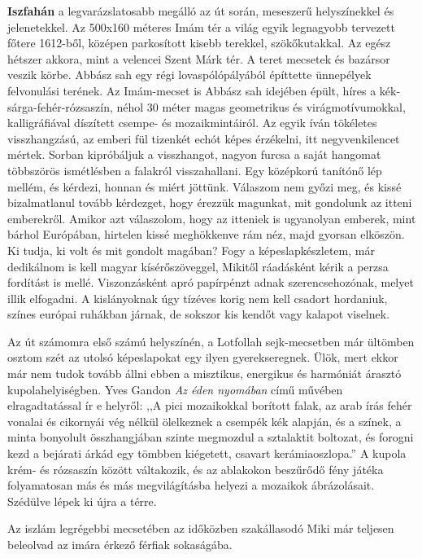 \textbf{Iszfahán} a legvarázslatosabb megálló az út során, meseszerű
helyszínekkel és jelenetekkel. Az 500x160 méteres Imám tér a világ egyik
legnagyobb tervezett főtere 1612-ből, középen parkosított kisebb terekkel,
szökőkutakkal. Az egész hétszer akkora, mint a velencei Szent
Márk tér. A teret mecsetek és bazársor veszik körbe. Abbász sah egy
régi lovaspólópályából építtette ünnepélyek felvonulási terének. Az
Imám-mecset is Abbász sah idejében épült, híres a kék-sárga-fehér-rózsaszín,
néhol 30 méter magas geometrikus és virágmotívumokkal,
kalligráfiával díszített csempe- és mozaikmintáiról. Az egyik íván
tökéletes visszhangzású, az emberi fül tizenkét echót képes érzékelni,
itt negyvenkilencet mértek. Sorban kipróbáljuk a visszhangot, nagyon
furcsa a saját hangomat többszörös ismétlésben a falakról visszahallani.
Egy középkorú tanítónő lép mellém, és kérdezi, honnan és miért
jöttünk. Válaszom nem győzi meg, és kissé bizalmatlanul tovább kérdezget,
hogy érezzük magunkat, mit gondolunk az itteni emberekről.
Amikor azt válaszolom, hogy az itteniek is ugyanolyan emberek, mint
bárhol Európában, hirtelen kissé meghökkenve rám néz, majd gyorsan
elköszön. Ki tudja, ki volt és mit gondolt magában? Fogy a képeslapkészletem,
már dedikálnom is kell magyar kísérőszöveggel, Mikitől
ráadásként kérik a perzsa fordítást is mellé. Viszonzásként apró
papírpénzt adnak szerencsehozónak, melyet illik elfogadni. A kislányoknak
úgy tízéves korig nem kell csadort hordaniuk, színes európai
ruhákban járnak, de sokszor kis kendőt vagy kalapot viselnek.


Az út számomra első számú helyszínén, a Lotfollah sejk-mecsetben
már ültömben osztom szét az utolsó képeslapokat egy ilyen gyerekseregnek.
Ülök, mert ekkor már nem tudok tovább állni ebben a misztikus,
energikus és harmóniát árasztó kupolahelyiségben. Yves Gandon
\textit{Az éden nyomában} című művében elragadtatással ír e helyről:
,,A pici
mozaikokkal borított falak, az arab írás fehér vonalai és cikornyái vég
nélkül ölelkeznek a csempék kék alapján, és a színek, a minta bonyolult
összhangjában szinte megmozdul a sztalaktit boltozat, és forogni
kezd a bejárati árkád egy tömbben kiégetett, csavart kerámiaoszlopa.''
A kupola krém- és rózsaszín között váltakozik, és az ablakokon beszűrődő
fény játéka folyamatosan más és más megvilágításba helyezi a
mozaikok ábrázolásait. Szédülve lépek ki újra a térre.

Az iszlám legrégebbi mecsetében az időközben szakállasodó Miki
már teljesen beleolvad az imára érkező férfiak sokaságába.

